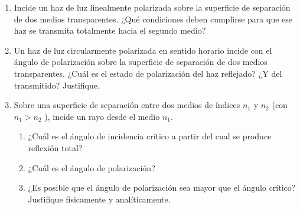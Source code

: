 \documentclass[11pt,spanish,a4paper]{article}
\begin{document}
\begin{enumerate}
\item  Incide un haz de luz linealmente polarizada sobre la superficie de separación de dos medios transparentes.
¿Qué condiciones deben cumplirse para que ese haz se transmita totalmente hacia el segundo medio?


\item  Un haz de luz circularmente polarizada en sentido horario incide con el ángulo de polarización sobre la superficie de separación de dos medios transparentes.
¿Cuál es el estado de polarización del haz reflejado?
¿Y del transmitido?
Justifique.
	   

\item Sobre una superficie de separación entre dos medios de índices \(n_1 \) y \(n_2 \) (con \(n_1 > n_2 \) ), incide un rayo desde el medio \(n_1 \).
	\begin{enumerate}
		\item ¿Cuál es el ángulo de incidencia crítico a partir del cual se produce reflexión total?
		\item ¿Cuál es el ángulo de polarización?
		\item ¿Es posible que el ángulo de polarización sea mayor que el ángulo crítico?
			Justifique físicamente y analíticamente.
	\end{enumerate}



\end{enumerate}
\end{document}

